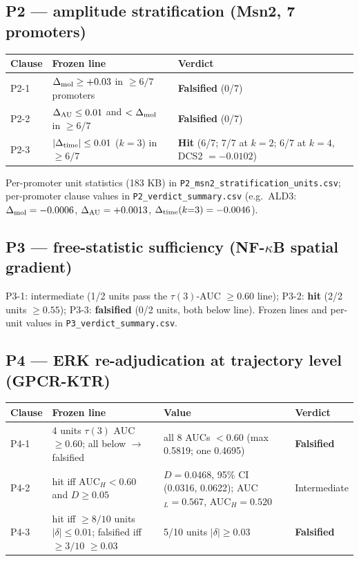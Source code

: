 \documentclass[11pt]{article}
\begin{document}
\subsection{P2 --- amplitude stratification (Msn2, 7 promoters)}

\begin{table}[h]
\centering\small
\begin{tabular}{p{1.2cm} p{6.8cm} p{6.8cm}}
\toprule
Clause & Frozen line & Verdict \\
\midrule
P2-1 & $\Delta_{\rm mol} \ge +0.03$ in $\ge 6/7$ promoters & \textbf{Falsified} (0/7) \\
P2-2 & $\Delta_{\rm AU} \le 0.01$ and $< \Delta_{\rm mol}$ in $\ge 6/7$ & \textbf{Falsified} (0/7) \\
P2-3 & $|\Delta_{\rm time}| \le 0.01$ ($k{=}3$) in $\ge 6/7$ & \textbf{Hit} (6/7; 7/7 at $k{=}2$; 6/7 at $k{=}4$, DCS2 $= -0.0102$) \\
\bottomrule
\end{tabular}
\end{table}

Per-promoter unit statistics (183 KB) in
\texttt{P2\_msn2\_stratification\_units.csv}; per-promoter clause values in
\texttt{P2\_verdict\_summary.csv} (e.g.\ ALD3: $\Delta_{\rm mol}=-0.0006$,
$\Delta_{\rm AU}=+0.0013$, $\Delta_{\rm time}(k{=}3)=-0.0046$).

\subsection{P3 --- free-statistic sufficiency (NF-$\kappa$B spatial gradient)}

P3-1: intermediate (1/2 units pass the $\tau(3)$-AUC $\ge 0.60$ line);
P3-2: \textbf{hit} (2/2 units $\ge 0.55$); P3-3: \textbf{falsified}
(0/2 units, both below line). Frozen lines and per-unit values in
\texttt{P3\_verdict\_summary.csv}.

\subsection{P4 --- ERK re-adjudication at trajectory level (GPCR-KTR)}

\begin{table}[h]
\centering\small
\begin{tabular}{p{1.2cm} p{4.6cm} p{3.4cm} p{4.6cm}}
\toprule
Clause & Frozen line & Value & Verdict \\
\midrule
P4-1 & 4 units $\tau(3)$ AUC $\ge 0.60$; all below $\to$ falsified & all 8 AUCs $<0.60$ (max 0.5819; one 0.4695) & \textbf{Falsified} \\
P4-2 & hit iff AUC$_H<0.60$ and $D\ge 0.05$ & $D = 0.0468$, 95\% CI (0.0316, 0.0622); AUC$_L=0.567$, AUC$_H=0.520$ & Intermediate \\
P4-3 & hit iff $\ge 8/10$ units $|\delta|\le 0.01$; falsified iff $\ge 3/10$ $\ge 0.03$ & 5/10 units $|\delta|\ge 0.03$ & \textbf{Falsified} \\
\bottomrule
\end{tabular}
\end{table}
\end{document}

